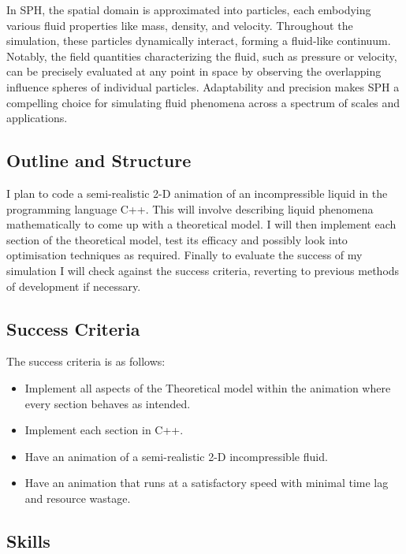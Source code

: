 \documentclass[write-up.tex]{subfiles}
\begin{document}
In SPH, the spatial domain is approximated into particles, each embodying various fluid properties like mass, density, and velocity. Throughout the simulation, these particles dynamically interact, forming a fluid-like continuum. Notably, the field quantities characterizing the fluid, such as pressure or velocity, can be precisely evaluated at any point in space by observing the overlapping influence spheres of individual particles. Adaptability and precision makes SPH a compelling choice for simulating fluid phenomena across a spectrum of scales and applications.

\subsection{Outline and Structure}
I plan to code a semi-realistic 2-D animation of an incompressible liquid in the programming language C++. This will involve describing liquid phenomena mathematically to come up with a theoretical model. I will then implement each section of the theoretical model, test its efficacy and possibly look into optimisation techniques as required. Finally to evaluate the success of my simulation I will check against the success criteria, reverting to previous methods of development if necessary.

\subsection{Success Criteria}
The success criteria is as follows:
\begin{itemize}
 \item Implement all aspects of the Theoretical model within the animation where every section behaves as intended.
 \item Implement each section in C++.
 \item Have an animation of a semi-realistic 2-D incompressible fluid.
 \item Have an animation that runs at a satisfactory speed with minimal time lag and resource wastage.
\end{itemize}
\subsection{Skills}


\end{document}
